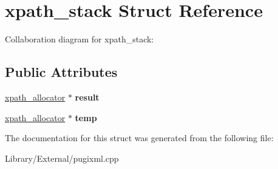 \hypertarget{structxpath__stack}{}\section{xpath\+\_\+stack Struct Reference}
\label{structxpath__stack}


Collaboration diagram for xpath\+\_\+stack\+:
\subsection*{Public Attributes}
\begin{DoxyCompactItemize}
\item 
\hypertarget{structxpath__stack_adce164b779cbb3d1bc093a772067ea7e}{}\hyperlink{classxpath__allocator}{xpath\+\_\+allocator} $\ast$ {\bfseries result}\label{structxpath__stack_adce164b779cbb3d1bc093a772067ea7e}

\item 
\hypertarget{structxpath__stack_a48edd585dfb910c6c016559f07fea0d8}{}\hyperlink{classxpath__allocator}{xpath\+\_\+allocator} $\ast$ {\bfseries temp}\label{structxpath__stack_a48edd585dfb910c6c016559f07fea0d8}

\end{DoxyCompactItemize}


The documentation for this struct was generated from the following file\+:\begin{DoxyCompactItemize}
\item 
Library/\+External/pugixml.\+cpp\end{DoxyCompactItemize}
